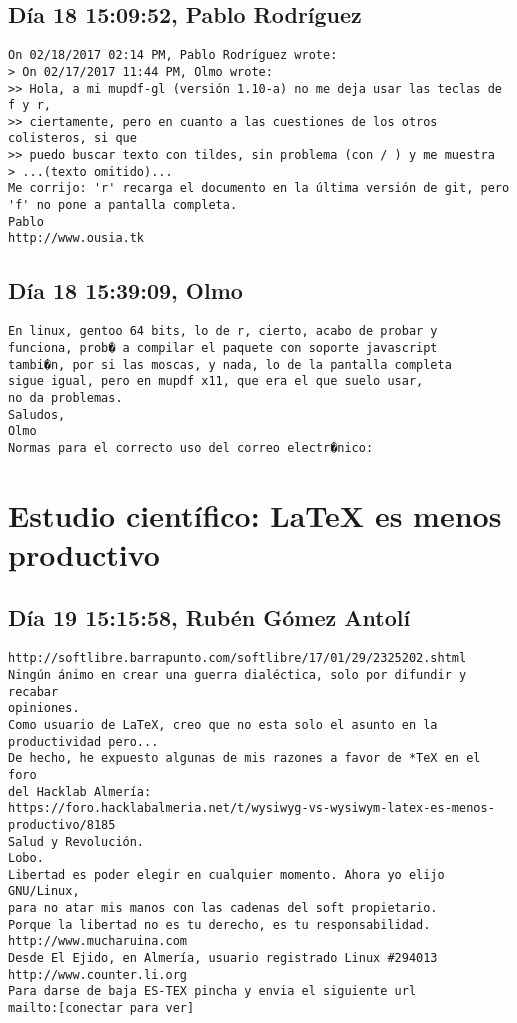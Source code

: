 \documentclass[a4paper,10pt]{article}
\begin{document}
\subsection{Día 18 15:09:52, Pablo Rodríguez}

\begin{lstlisting}
On 02/18/2017 02:14 PM, Pablo Rodríguez wrote:
> On 02/17/2017 11:44 PM, Olmo wrote:
>> Hola, a mi mupdf-gl (versión 1.10-a) no me deja usar las teclas de f y r,
>> ciertamente, pero en cuanto a las cuestiones de los otros colisteros, si que
>> puedo buscar texto con tildes, sin problema (con / ) y me muestra
> ...(texto omitido)...
Me corrijo: 'r' recarga el documento en la última versión de git, pero
'f' no pone a pantalla completa.
Pablo
http://www.ousia.tk

\end{lstlisting}

\subsection{Día 18 15:39:09, Olmo}

\begin{lstlisting}
En linux, gentoo 64 bits, lo de r, cierto, acabo de probar y
funciona, prob� a compilar el paquete con soporte javascript
tambi�n, por si las moscas, y nada, lo de la pantalla completa
sigue igual, pero en mupdf x11, que era el que suelo usar,
no da problemas.
Saludos,
Olmo
Normas para el correcto uso del correo electr�nico:

\end{lstlisting}
\section{Estudio científico: LaTeX es menos productivo}

\subsection{Día 19 15:15:58, Rubén Gómez Antolí}

\begin{lstlisting}
http://softlibre.barrapunto.com/softlibre/17/01/29/2325202.shtml
Ningún ánimo en crear una guerra dialéctica, solo por difundir y recabar
opiniones.
Como usuario de LaTeX, creo que no esta solo el asunto en la
productividad pero...
De hecho, he expuesto algunas de mis razones a favor de *TeX en el foro
del Hacklab Almería:
https://foro.hacklabalmeria.net/t/wysiwyg-vs-wysiwym-latex-es-menos-productivo/8185
Salud y Revolución.
Lobo.
Libertad es poder elegir en cualquier momento. Ahora yo elijo GNU/Linux,
para no atar mis manos con las cadenas del soft propietario.
Porque la libertad no es tu derecho, es tu responsabilidad.
http://www.mucharuina.com
Desde El Ejido, en Almería, usuario registrado Linux #294013
http://www.counter.li.org
Para darse de baja ES-TEX pincha y envia el siguiente url
mailto:[conectar para ver]

\end{lstlisting}
\end{document}
